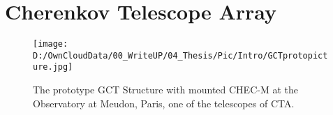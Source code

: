 \documentclass[12pt,article,type=msc,colorback,accentcolor=tud9c]{tudthesis}
\begin{document}


\clearpage
\section{\Large Cherenkov Telescope Array}
\label{sec:CTA}

\begin{wrapfigure}{R}{0.6\textwidth}
\centering
\texttt{[image: D:/OwnCloudData/00\_WriteUP/04\_Thesis/Pic/Intro/GCTprotopicture.jpg]}
\caption[GCT and CHEC-M at Meudon]{\label{fig:GCTStructure}The prototype GCT Structure with mounted CHEC-M at the Observatory at Meudon, Paris, one of the telescopes of CTA.}
\end{wrapfigure}
\end{document}
